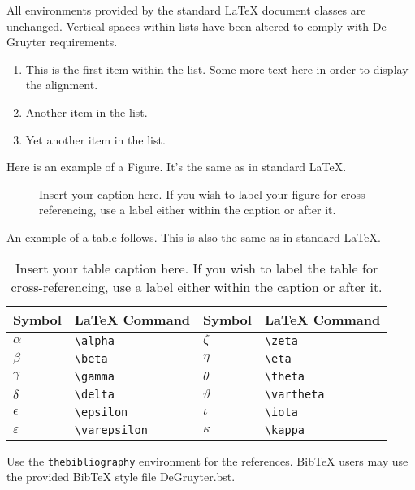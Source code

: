 \documentclass[letterpaper,12pt]{article}
\begin{document}
All environments provided by the standard LaTeX document classes are
unchanged. Vertical spaces within lists have been altered to comply with De Gruyter
requirements.
\begin{enumerate}
\item This is the first item within the list. Some more text here in order to
  display the alignment.
\item Another item in the list.
\item Yet another item in the list.
\end{enumerate}

Here is an example of a Figure. It's the same as in standard LaTeX.

\begin{figure}[!h]
\centering
\caption{Insert your caption here. If you wish to label your figure for
  cross-referencing, use a label either within the caption or after it.}
\label{fig1}
\end{figure}

An example of a table follows. This is also the same as in standard LaTeX.

\begin{table}[!h]
\centering
\caption{Insert your table caption here. If you wish to label the table for
  cross-referencing, use a label either within the caption or after it.}
\begin{tabular}{llll}
\hline
Symbol        & LaTeX Command      & Symbol      & LaTeX Command \\
\hline
$\alpha$      & \verb+\alpha+      & $\zeta$     & \verb+\zeta+ \\
$\beta$       & \verb+\beta+       & $\eta$      & \verb+\eta+ \\
$\gamma$      & \verb+\gamma+      & $\theta$    & \verb+\theta+ \\
$\delta$      & \verb+\delta+      & $\vartheta$ & \verb+\vartheta+ \\
$\epsilon$    & \verb+\epsilon+    & $\iota$     & \verb+\iota+ \\
$\varepsilon$ & \verb+\varepsilon+ & $\kappa$    & \verb+\kappa+ \\
\hline
\end{tabular}
\end{table}

Use the \verb+thebibliography+ environment for the references.  BibTeX users may
use the provided BibTeX style file DeGruyter.bst.



\end{document}
